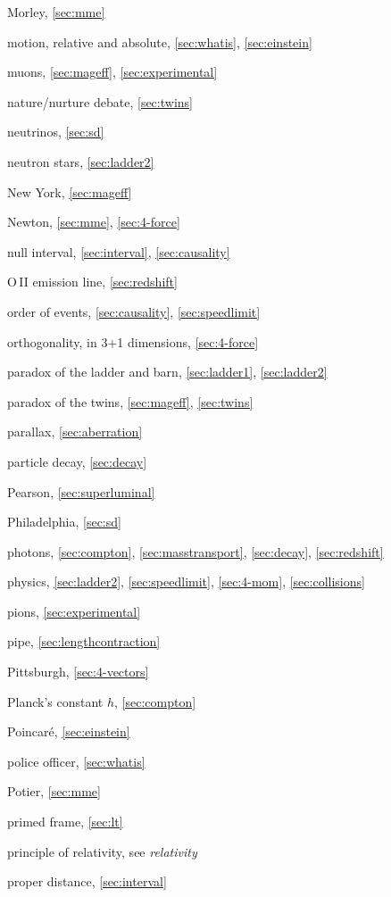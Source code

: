 \begin{theindex}
\item Morley, \ref{sec:mme}
\item motion, relative and absolute, \ref{sec:whatis}, \ref{sec:einstein}
\item muons, \ref{sec:mageff}, \ref{sec:experimental}
\item nature/nurture debate, \ref{sec:twins}
\item neutrinos, \ref{sec:sd}
\item neutron stars, \ref{sec:ladder2}
\item New York, \ref{sec:mageff}
\item Newton, \ref{sec:mme}, \ref{sec:4-force}
\item null interval, \ref{sec:interval}, \ref{sec:causality}
\item [O\,II] emission line, \ref{sec:redshift}
\item order of events, \ref{sec:causality}, \ref{sec:speedlimit}
\item orthogonality, in 3+1 dimensions, \ref{sec:4-force}
\item paradox of the ladder and barn, \ref{sec:ladder1}, \ref{sec:ladder2}
\item paradox of the twins, \ref{sec:mageff}, \ref{sec:twins}
\item parallax, \ref{sec:aberration}
\item particle decay, \ref{sec:decay}
\item Pearson, \ref{sec:superluminal}
\item Philadelphia, \ref{sec:sd}
\item photons, \ref{sec:compton}, \ref{sec:masstransport}, \ref{sec:decay},
	\ref{sec:redshift}
\item physics, \ref{sec:ladder2}, \ref{sec:speedlimit}, \ref{sec:4-mom},
	\ref{sec:collisions}
\item pions, \ref{sec:experimental}
\item pipe, \ref{sec:lengthcontraction}
\item Pittsburgh, \ref{sec:4-vectors}
\item Planck's constant $h$, \ref{sec:compton}
\item Poincar\'e, \ref{sec:einstein}
\item police officer, \ref{sec:whatis}
\item Potier, \ref{sec:mme}
\item primed frame, \ref{sec:lt}
\item principle of relativity, see {\it relativity}
\item proper distance, \ref{sec:interval}

\end{theindex}
